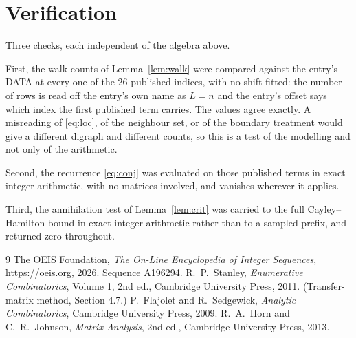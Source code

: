 \documentclass[11pt,a4paper]{article}
\theoremstyle{plain}
\theoremstyle{definition}
\begin{document}
\section{Verification}

Three checks, each independent of the algebra above.

First, the walk counts of Lemma~\ref{lem:walk} were compared against the entry's DATA at
every one of the $26$ published indices, with no shift fitted: the number of rows is
read off the entry's own name as $L=n$ and the entry's offset says which index the first
published term carries. The values agree exactly. A misreading of \eqref{eq:loc}, of the
neighbour set, or of the boundary treatment would give a different digraph and different
counts, so this is a test of the modelling and not only of the arithmetic.

Second, the recurrence \eqref{eq:conj} was evaluated on those published terms in exact
integer arithmetic, with no matrices involved, and vanishes wherever it applies.

Third, the annihilation test of Lemma~\ref{lem:crit} was carried to the full
Cayley--Hamilton bound in exact integer arithmetic rather than to a sampled prefix, and
returned zero throughout.

\begin{thebibliography}{9}
 The OEIS Foundation, \emph{The On-Line Encyclopedia of Integer
Sequences}, \url{https://oeis.org}, 2026. Sequence A196294.
 R.~P.~Stanley, \emph{Enumerative Combinatorics}, Volume 1, 2nd ed.,
Cambridge University Press, 2011. (Transfer-matrix method, Section 4.7.)
 P.~Flajolet and R.~Sedgewick, \emph{Analytic Combinatorics}, Cambridge
University Press, 2009.
 R.~A.~Horn and C.~R.~Johnson, \emph{Matrix Analysis}, 2nd ed., Cambridge
University Press, 2013.
\end{thebibliography}
\end{document}
